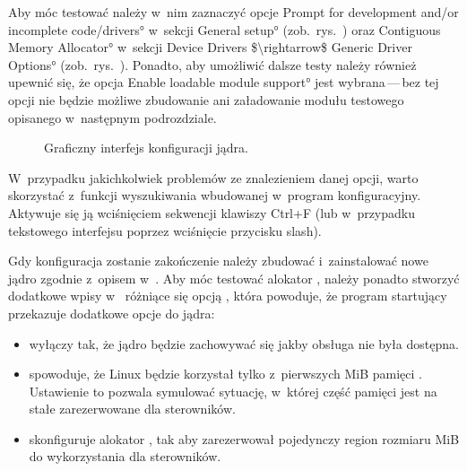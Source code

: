 Aby móc testować  należy w~nim zaznaczyć opcje \ang*{Prompt
  for development and/or incomplete code/drivers} w~sekcji
\ang*{General setup} (zob.\ rys.\ ) oraz
\ang*{Contiguous Memory Allocator} w~sekcji \ang*{Device Drivers
  $\rightarrow$ Generic Driver Options}
(zob.\ rys.\ ).  Ponadto, aby umożliwić
dalsze testy należy również upewnić się, że opcja \ang*{Enable
  loadable module support} jest wybrana\,---\,bez tej opcji nie będzie
możliwe zbudowanie ani załadowanie modułu testowego opisanego
w~następnym podrozdziale.

\begin{figure}[tbp]
  \centering
  \vspace{\baselineskip}
  \caption{Graficzny interfejs konfiguracji jądra.}
  \label{fig:xconfig}
\end{figure}

W~przypadku jakichkolwiek problemów ze znalezieniem danej opcji, warto
skorzystać z~funkcji wyszukiwania wbudowanej w~program konfiguracyjny.
Aktywuje się ją wciśnięciem sekwencji klawiszy Ctrl+F (lub w~przypadku
tekstowego interfejsu  poprzez wciśnięcie przycisku
slash).

Gdy konfiguracja zostanie zakończenie należy zbudować i~zainstalować
nowe jądro zgodnie z~opisem w~\autocite{bib:building-linux}.  Aby móc
testować alokator , należy ponadto stworzyć dodatkowe wpisy
w~ różniące się opcją , która
powoduje, że program startujący przekazuje dodatkowe opcje do jądra:

\begin{itemize}
\item {} wyłączy  tak, że jądro będzie
  zachowywać się jakby obsługa  nie była dostępna.
\item {} spowoduje, że Linux będzie
  korzystał tylko z~pierwszych \unit[512]{MiB} pamięci .  Ustawienie
  to pozwala symulować sytuację, w~której część pamięci jest na stałe
  zarezerwowane dla sterowników.
\item {} skonfiguruje alokator , tak aby
  zarezerwował pojedynczy region rozmiaru \unit[512]{MiB} do
  wykorzystania dla sterowników.
\end{itemize}

